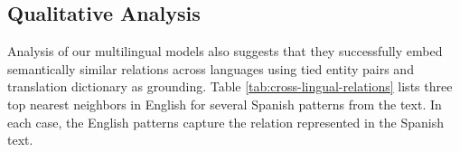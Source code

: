 \subsection{Qualitative Analysis \label{sec:qual-anal}}


Analysis of our multilingual models also suggests that they successfully embed semantically similar relations across languages using tied entity pairs and translation dictionary as grounding. Table \ref{tab:cross-lingual-relations} lists three top nearest neighbors in English for several Spanish patterns from the text. In each case, the English patterns capture the relation represented in the Spanish text. 

\newcommand{\tablespace}{\end{tabular}
\newline
\newline
\begin{tabular}{|p{7.6cm}|}
}
